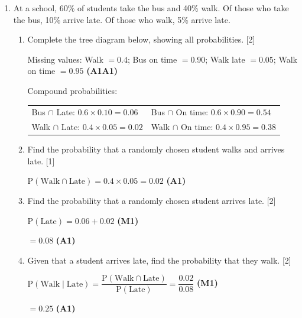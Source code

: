 \documentclass[12pt, twoside]{article}
\begin{document}
\begin{enumerate}[itemsep=0.1cm]
\begin{enumerate}[itemsep=0.3cm]
  $\mathrm{P}(\text{IB} \cap \text{nSpire}) = \dfrac{8}{16} = 0.5$

  $0.352 \neq 0.5$, so the events are \textbf{not independent}. \hfill \textbf{(R1)}
\end{enumerate}

\newpage

\item At a school, 60\% of students take the bus and 40\% walk.
Of those who take the bus, 10\% arrive late.
Of those who walk, 5\% arrive late.

\begin{enumerate}[itemsep=0.3cm]
  \item Complete the tree diagram below, showing all probabilities. \hfill [2]

  Missing values: Walk $= 0.4$; Bus on time $= 0.90$;
  Walk late $= 0.05$; Walk on time $= 0.95$ \hfill \textbf{(A1A1)}

  Compound probabilities:

  \begin{tabular}{ll}
    Bus $\cap$ Late: $0.6 \times 0.10 = 0.06$ &
    Bus $\cap$ On time: $0.6 \times 0.90 = 0.54$ \\
    Walk $\cap$ Late: $0.4 \times 0.05 = 0.02$ &
    Walk $\cap$ On time: $0.4 \times 0.95 = 0.38$ \\
  \end{tabular}

  \item Find the probability that a randomly chosen student walks and
        arrives late. \hfill [1]

  $\mathrm{P}(\text{Walk} \cap \text{Late}) = 0.4 \times 0.05 = 0.02$ \hfill \textbf{(A1)}

  \item Find the probability that a randomly chosen student arrives late. \hfill [2]

  $\mathrm{P}(\text{Late}) = 0.06 + 0.02$ \hfill \textbf{(M1)}

  $= 0.08$ \hfill \textbf{(A1)}

  \item Given that a student arrives late, find the probability that they walk. \hfill [2]

  $\mathrm{P}(\text{Walk} \mid \text{Late})
    = \dfrac{\mathrm{P}(\text{Walk} \cap \text{Late})}{\mathrm{P}(\text{Late})}
    = \dfrac{0.02}{0.08}$ \hfill \textbf{(M1)}

  $= 0.25$ \hfill \textbf{(A1)}
\end{enumerate}


\end{enumerate}
\end{document}
